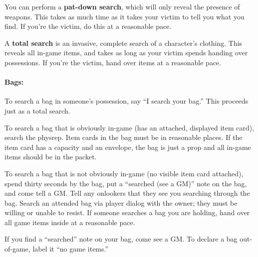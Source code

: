 \documentclass[sheet]{airship}
\begin{document}
You can perform a {\bf pat-down search}, which will only reveal the
presence of weapons.  This takes as much time as it takes your victim
to tell you what you find.  If you're the victim, do this at a
reasonable pace.

A {\bf total search} is an invasive, complete search of a character's
clothing.  This reveals all in-game items, and takes as long as your
victim spends handing over possessions.  If you're the victim, hand
over items at a reasonable pace.

\paragraph{Bags:} To search a bag in someone's possession, say ``I
search your bag.''  This proceeds just as a total search.

To search a bag that is obviously in-game (has an attached, displayed
item card), search the physrep.  Item cards in the bag must be in
reasonable places.  If the item card has a capacity and an envelope,
the bag is just a prop and all in-game items should be in the packet.

To search a bag that is not obviously in-game (no visible item card
attached), spend thirty seconds by the bag, put a ``searched (see a
GM)'' note on the bag, and come tell a GM.  Tell any onlookers that
they see you searching through the bag.  Search an attended bag via
player dialog with the owner; they must be willing or unable to
resist.  If someone searches a bag you are holding, hand over all game
items inside at a reasonable pace.

If you find a ``searched'' note on your bag, come see a GM.  To
declare a bag out-of-game, label it ``no game items.''

%
\end{document}

